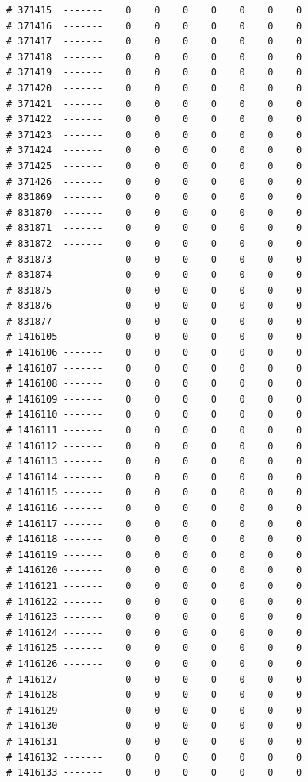 \documentclass{article}\usepackage[]{graphicx}\usepackage[]{color}
\makeatletter
\newenvironment{kframe}{%
 \def\at@end@of@kframe{}%
 \ifinner\ifhmode%
  \def\at@end@of@kframe{\end{minipage}}%
  \begin{minipage}{\columnwidth}%
 \fi\fi%
 \def\FrameCommand##1{\hskip\@totalleftmargin \hskip-\fboxsep
 \colorbox{shadecolor}{##1}\hskip-\fboxsep
     \hskip-\linewidth \hskip-\@totalleftmargin \hskip\columnwidth}%
 \MakeFramed {\advance\hsize-\width
   \@totalleftmargin\z@ \linewidth\hsize
   \@setminipage}}%
 {\par\unskip\endMakeFramed%
 \at@end@of@kframe}
\newenvironment{knitrout}{}{} %
\makeatother
\begin{document}
\begin{knitrout}
\begin{kframe}
\begin{verbatim}
# 371415  -------    0    0    0    0    0    0    0
# 371416  -------    0    0    0    0    0    0    0
# 371417  -------    0    0    0    0    0    0    0
# 371418  -------    0    0    0    0    0    0    0
# 371419  -------    0    0    0    0    0    0    0
# 371420  -------    0    0    0    0    0    0    0
# 371421  -------    0    0    0    0    0    0    0
# 371422  -------    0    0    0    0    0    0    0
# 371423  -------    0    0    0    0    0    0    0
# 371424  -------    0    0    0    0    0    0    0
# 371425  -------    0    0    0    0    0    0    0
# 371426  -------    0    0    0    0    0    0    0
# 831869  -------    0    0    0    0    0    0    0
# 831870  -------    0    0    0    0    0    0    0
# 831871  -------    0    0    0    0    0    0    0
# 831872  -------    0    0    0    0    0    0    0
# 831873  -------    0    0    0    0    0    0    0
# 831874  -------    0    0    0    0    0    0    0
# 831875  -------    0    0    0    0    0    0    0
# 831876  -------    0    0    0    0    0    0    0
# 831877  -------    0    0    0    0    0    0    0
# 1416105 -------    0    0    0    0    0    0    0
# 1416106 -------    0    0    0    0    0    0    0
# 1416107 -------    0    0    0    0    0    0    0
# 1416108 -------    0    0    0    0    0    0    0
# 1416109 -------    0    0    0    0    0    0    0
# 1416110 -------    0    0    0    0    0    0    0
# 1416111 -------    0    0    0    0    0    0    0
# 1416112 -------    0    0    0    0    0    0    0
# 1416113 -------    0    0    0    0    0    0    0
# 1416114 -------    0    0    0    0    0    0    0
# 1416115 -------    0    0    0    0    0    0    0
# 1416116 -------    0    0    0    0    0    0    0
# 1416117 -------    0    0    0    0    0    0    0
# 1416118 -------    0    0    0    0    0    0    0
# 1416119 -------    0    0    0    0    0    0    0
# 1416120 -------    0    0    0    0    0    0    0
# 1416121 -------    0    0    0    0    0    0    0
# 1416122 -------    0    0    0    0    0    0    0
# 1416123 -------    0    0    0    0    0    0    0
# 1416124 -------    0    0    0    0    0    0    0
# 1416125 -------    0    0    0    0    0    0    0
# 1416126 -------    0    0    0    0    0    0    0
# 1416127 -------    0    0    0    0    0    0    0
# 1416128 -------    0    0    0    0    0    0    0
# 1416129 -------    0    0    0    0    0    0    0
# 1416130 -------    0    0    0    0    0    0    0
# 1416131 -------    0    0    0    0    0    0    0
# 1416132 -------    0    0    0    0    0    0    0
# 1416133 -------    0    0    0    0    0    0    0

\end{verbatim}
\end{kframe}
\end{knitrout}
\end{document}
